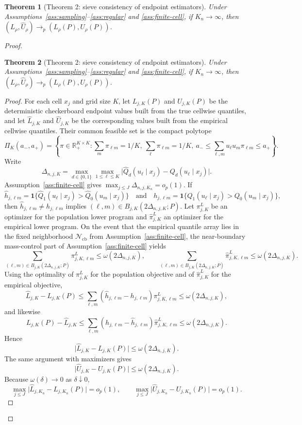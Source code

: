 \documentclass[11pt]{article}
\newcommand{\one}{\mathbf{1}}
\theoremstyle{definition}
\theoremstyle{plain}
\newtheorem{theorem}{Theorem}
\theoremstyle{remark}
\begin{document}
\begin{theorem}[Theorem 2: sieve consistency of endpoint estimators]\label{thm:thm:sieve-consistency}
Under Assumptions~\ref{ass:sampling}--\ref{ass:regular} and \ref{ass:finite-cell}, if \(K_n\to\infty\), then \((\widehat L_\rho,\widehat U_\rho)\to_p(L_\rho(P),U_\rho(P))\).
\end{theorem}
\begin{proof}
\begin{theorem}[Theorem 2: sieve consistency of endpoint estimators]\label{thm:sieve-consistency}
Under Assumptions~\ref{ass:sampling}--\ref{ass:regular} and \ref{ass:finite-cell}, if \(K_n\to\infty\), then \((\widehat L_\rho,\widehat U_\rho)\to_p(L_\rho(P),U_\rho(P))\).
\end{theorem}
\begin{proof}
For each cell \(x_j\) and grid size \(K\), let \(L_{j,K}(P)\) and \(U_{j,K}(P)\) be the deterministic checkerboard endpoint values built from the true cellwise quantiles, and let \(\widehat L_{j,K}\) and \(\widehat U_{j,K}\) be the corresponding values built from the empirical cellwise quantiles. Their common feasible set is the compact polytope
\[
\Pi_K(a_-,a_+)=\left\{\pi\in\mathbb R_+^{K\times K}:\sum_m\pi_{\ell m}=1/K,\ \sum_\ell\pi_{\ell m}=1/K,\ a_-\le \sum_{\ell,m}u_\ell u_m\pi_{\ell m}\le a_+\right\}.
\]
Write
\[
\Delta_{n,j,K}=\max_{d\in\{0,1\}}\max_{1\le \ell\le K}\bigl|\widehat Q_d(u_\ell\mid x_j)-Q_d(u_\ell\mid x_j)\bigr|.
\]
Assumption~\ref{ass:finite-cell} gives \(\max_{j\le J}\Delta_{n,j,K_n}=o_p(1)\). If
\[
\widehat h_{j,\ell m}=\one\{\widehat Q_1(u_\ell\mid x_j)>\widehat Q_0(u_m\mid x_j)\}
\quad\text{and}\quad
h_{j,\ell m}=\one\{Q_1(u_\ell\mid x_j)>Q_0(u_m\mid x_j)\},
\]
then \(\widehat h_{j,\ell m}\neq h_{j,\ell m}\) implies \((\ell,m)\in B_{j,K}(2\Delta_{n,j,K};P)\). Let \(\pi^{L}_{j,K}\) be an optimizer for the population lower program and \(\widehat\pi^{L}_{j,K}\) an optimizer for the empirical lower program. On the event that the empirical quantile array lies in the fixed neighborhood \(\mathcal N_{\mathrm{cb}}\) from Assumption~\ref{ass:finite-cell}, the near-boundary mass-control part of Assumption~\ref{ass:finite-cell} yields
\[
\sum_{(\ell,m)\in B_{j,K}(2\Delta_{n,j,K};P)} \pi^{L}_{j,K,\ell m}\le \omega(2\Delta_{n,j,K}),
\qquad
\sum_{(\ell,m)\in B_{j,K}(2\Delta_{n,j,K};P)} \widehat\pi^{L}_{j,K,\ell m}\le \omega(2\Delta_{n,j,K}).
\]
Using the optimality of \(\pi^{L}_{j,K}\) for the population objective and of \(\widehat\pi^{L}_{j,K}\) for the empirical objective,
\[
\widehat L_{j,K}-L_{j,K}(P)
\le \sum_{\ell,m}(\widehat h_{j,\ell m}-h_{j,\ell m})\pi^{L}_{j,K,\ell m}
\le \omega(2\Delta_{n,j,K}),
\]
and likewise
\[
L_{j,K}(P)-\widehat L_{j,K}
\le \sum_{\ell,m}(h_{j,\ell m}-\widehat h_{j,\ell m})\widehat\pi^{L}_{j,K,\ell m}
\le \omega(2\Delta_{n,j,K}).
\]
Hence
\[
\bigl|\widehat L_{j,K}-L_{j,K}(P)\bigr|\le \omega(2\Delta_{n,j,K}).
\]
The same argument with maximizers gives
\[
\bigl|\widehat U_{j,K}-U_{j,K}(P)\bigr|\le \omega(2\Delta_{n,j,K}).
\]
Because \(\omega(\delta)\to0\) as \(\delta\downarrow0\),
\[
\max_{j\le J}\bigl|\widehat L_{j,K_n}-L_{j,K_n}(P)\bigr|=o_p(1),
\qquad
\max_{j\le J}\bigl|\widehat U_{j,K_n}-U_{j,K_n}(P)\bigr|=o_p(1).
\]


\end{proof}
\end{proof}
\end{document}

